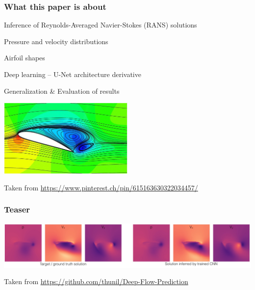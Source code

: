 
\begin{frame}
    \frametitle{What this paper is about}
	\vspace*{0.8cm}
\begin{multicols}{2}
\begin{PraesentationAufzaehlung}
	
\item Inference of Reynolds-Averaged Navier-Stokes (RANS) solutions 

\item Pressure and velocity distributions

\item Airfoil shapes

\item Deep learning -- U-Net architecture derivative 

\item Generalization \& Evaluation of results
\end{PraesentationAufzaehlung}
\vfill\columnbreak
\includegraphics[width=0.5\textwidth, height=.5\textheight]{./Ressourcen/Praesentation/Bilder/streamlines.jpg}

\end{multicols}
Taken from \url{https://www.pinterest.ch/pin/615163630322034457/}

\end{frame}
\clearpage

\begin{frame}
    \frametitle{Teaser}
	\vspace*{3cm}
	
	\includegraphics[width=\textwidth, height=.3\textheight]{./Ressourcen/Praesentation/Bilder/teaser.jpg}
	
\vspace*{1cm}	
Taken from \url{https://github.com/thunil/Deep-Flow-Prediction}
	
\end{frame}
\clearpage